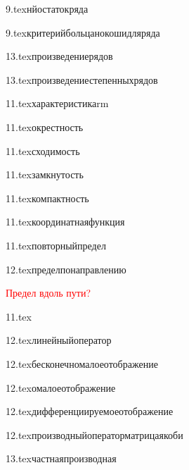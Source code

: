 

{9.tex}{нйостатокряда}

{9.tex}{критерийбольцанокошидляряда}

{13.tex}{произведениерядов}

{13.tex}{произведениестепенныхрядов}

{11.tex}{характеристикаrm}

{11.tex}{окрестность}

{11.tex}{сходимость}
\label{сходимость}

{11.tex}{замкнутость}

{11.tex}{компактность}

{11.tex}{координатнаяфункция}

{11.tex}{повторныйпредел}

{12.tex}{пределпонаправлению}

\textcolor{red}{Предел вдоль пути?}

{11.tex}{}

{12.tex}{линейныйоператор}

{12.tex}{бесконечномалоеотображение}

{12.tex}{омалоеотображение}

{12.tex}{дифференциируемоеотображение}

{12.tex}{производныйоператорматрицаякоби}

{13.tex}{частнаяпроизводная}

